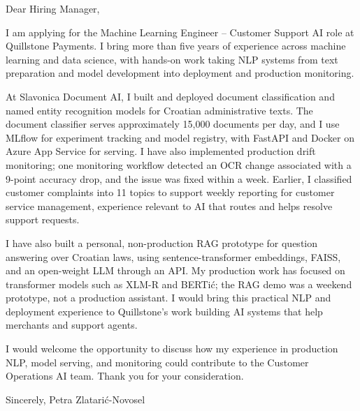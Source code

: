 \documentclass[11pt,a4paper]{article}
\begin{document}
Dear Hiring Manager,

I am applying for the Machine Learning Engineer -- Customer Support AI role at Quillstone Payments. I bring more than five years of experience across machine learning and data science, with hands-on work taking NLP systems from text preparation and model development into deployment and production monitoring.

At Slavonica Document AI, I built and deployed document classification and named entity recognition models for Croatian administrative texts. The document classifier serves approximately 15,000 documents per day, and I use MLflow for experiment tracking and model registry, with FastAPI and Docker on Azure App Service for serving. I have also implemented production drift monitoring; one monitoring workflow detected an OCR change associated with a 9-point accuracy drop, and the issue was fixed within a week. Earlier, I classified customer complaints into 11 topics to support weekly reporting for customer service management, experience relevant to AI that routes and helps resolve support requests.

I have also built a personal, non-production RAG prototype for question answering over Croatian laws, using sentence-transformer embeddings, FAISS, and an open-weight LLM through an API. My production work has focused on transformer models such as XLM-R and BERTić; the RAG demo was a weekend prototype, not a production assistant. I would bring this practical NLP and deployment experience to Quillstone’s work building AI systems that help merchants and support agents.

I would welcome the opportunity to discuss how my experience in production NLP, model serving, and monitoring could contribute to the Customer Operations AI team. Thank you for your consideration.

Sincerely,
Petra Zlatarić-Novosel
\end{document}
